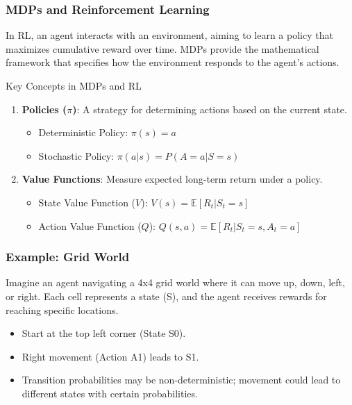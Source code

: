 \documentclass[aspectratio=169]{beamer}
\begin{document}
\begin{frame}[fragile]
    \frametitle{MDPs and Reinforcement Learning}
    In RL, an agent interacts with an environment, aiming to learn a policy that maximizes cumulative reward over time. MDPs provide the mathematical framework that specifies how the environment responds to the agent's actions.

    \begin{block}{Key Concepts in MDPs and RL}
        \begin{enumerate}
            \item \textbf{Policies ($\pi$)}: A strategy for determining actions based on the current state.
                \begin{itemize}
                    \item Deterministic Policy: $\pi(s) = a$
                    \item Stochastic Policy: $\pi(a|s) = P(A = a | S = s)$
                \end{itemize}
            \item \textbf{Value Functions}: Measure expected long-term return under a policy.
                \begin{itemize}
                    \item State Value Function ($V$): $V(s) = \mathbb{E}[R_t | S_t = s]$
                    \item Action Value Function ($Q$): $Q(s, a) = \mathbb{E}[R_t | S_t = s, A_t = a]$
                \end{itemize}
        \end{enumerate}
    \end{block}
\end{frame}

\begin{frame}[fragile]
    \frametitle{Example: Grid World}
    Imagine an agent navigating a 4x4 grid world where it can move up, down, left, or right. Each cell represents a state (S), and the agent receives rewards for reaching specific locations.

    \begin{itemize}
        \item Start at the top left corner (State S0).
        \item Right movement (Action A1) leads to S1.
        \item Transition probabilities may be non-deterministic; movement could lead to different states with certain probabilities.
    \end{itemize}
\end{frame}
\end{document}
